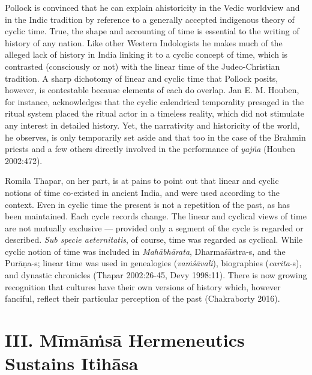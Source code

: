Pollock is convinced that he can explain ahistoricity in the Vedic worldview and in the Indic tradition by reference to a generally accepted indigenous theory of cyclic time. True, the shape and accounting of time is essential to the writing of history of any nation. Like other Western Indologists he makes much of the alleged lack of history in India linking it to a cyclic concept of time, which is contrasted (consciously or not) with the linear time of the Judeo-Christian tradition. A sharp dichotomy of linear and cyclic time that Pollock posits, however, is contestable because elements of each do overlap. Jan E. M. Houben, for instance, acknowledges that the cyclic calendrical temporality presaged in the ritual system placed the ritual actor in a timeless reality, which did not stimulate any interest in detailed history. Yet, the narrativity and historicity of the world, he observes, is only temporarily set aside and that too in the case of the Brahmin priests and a few others directly involved in the performance of \textit{yajña} (Houben 2002:472).

Romila Thapar, on her part, is at pains to point out that linear and cyclic notions of time co-existed in ancient India, and were used according to the context. Even in cyclic time  the present is not a repetition of the past, as has been maintained. Each cycle records change. The linear and cyclical views of time are not mutually exclusive — provided only a segment of the cycle is regarded or described. \textit{Sub specie aeternitatis}, of course, time was regarded as cyclical. While cyclic notion of time was included in \textit{Mahābhārata}, Dharmaśāstra-s, and the Purāṇa-s; linear time was used in genealogies (\textit{vaṁśāvali}), biographies (\textit{carita}-s), and dynastic chronicles (Thapar 2002:26-45, Devy 1998:11). There is now growing recognition that cultures have their own versions of history which, however fanciful, reflect their particular perception of the past (Chakraborty 2016).


\section*{III. Mīmāṁsā Hermeneutics Sustains Itihāsa}

